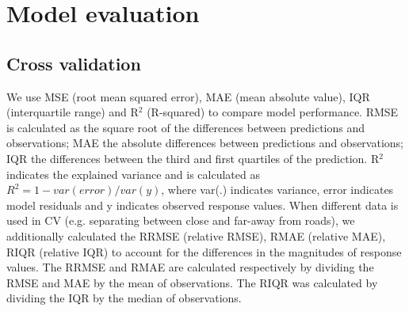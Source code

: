 \documentclass{article}
\begin{document}
\section{Model evaluation}

\subsection{Cross validation}
We use MSE (root mean squared error), MAE (mean absolute value), IQR (interquartile range) and R$^2$ (R-squared) to compare model performance.   
RMSE is calculated as the square root of the differences between predictions and observations; MAE the absolute differences between predictions and observations; IQR the differences between the third and first quartiles of the prediction. R$^2$ indicates the explained variance and is calculated as $R^2 = 1- var(error) / var(y)$, where var(.) indicates variance, error indicates model residuals and y indicates observed response values. When different data is used in CV (e.g. separating between close and far-away from roads), we additionally calculated the RRMSE (relative RMSE), RMAE (relative MAE), RIQR (relative IQR) to account for the differences in the magnitudes of response values. The RRMSE and RMAE are calculated respectively by dividing the RMSE and MAE by the mean of observations. The RIQR was calculated by dividing the IQR by the median of observations.  
\end{document}

